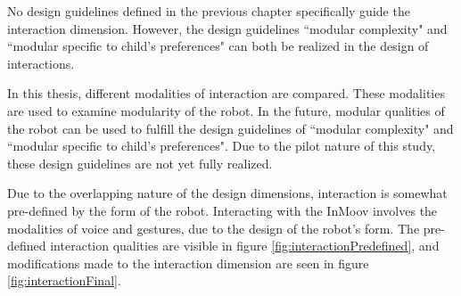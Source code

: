 No design guidelines defined in the previous chapter specifically guide the interaction dimension. However, the design guidelines ``modular complexity" and ``modular specific to child's preferences" can both be realized in the design of interactions. 

In this thesis, different modalities of interaction are compared. These modalities are used to examine modularity of the robot. In the future, modular qualities of the robot can be used to fulfill the design guidelines of ``modular complexity" and ``modular specific to child's preferences". Due to the pilot nature of this study, these design guidelines are not yet fully realized.

Due to the overlapping nature of the design dimensions, interaction is somewhat pre-defined by the form of the robot. Interacting with the InMoov involves the modalities of voice and gestures, due to the design of the robot's form. The pre-defined interaction qualities are visible in figure \ref{fig:interactionPredefined}, and modifications made to the interaction dimension are seen in figure \ref{fig:interactionFinal}.


